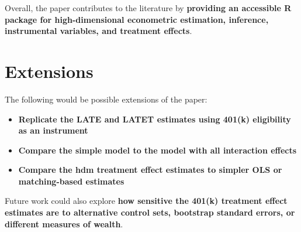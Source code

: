 \documentclass[12pt]{article}
\begin{document}
Overall, the paper contributes to the literature by \textbf{providing an accessible R package for high-dimensional econometric estimation, inference, instrumental variables, and treatment effects}.


\section{Extensions}

The following would be possible extensions of the paper:

\begin{itemize}
    \item \textbf{Replicate the LATE and LATET estimates using 401(k) eligibility as an instrument}
    \item \textbf{Compare the simple model to the model with all interaction effects}
    \item \textbf{Compare the hdm treatment effect estimates to simpler OLS or matching-based estimates}
\end{itemize}

Future work could also explore \textbf{how sensitive the 401(k) treatment effect estimates are to alternative control sets, bootstrap standard errors, or different measures of wealth}.



\end{document}
